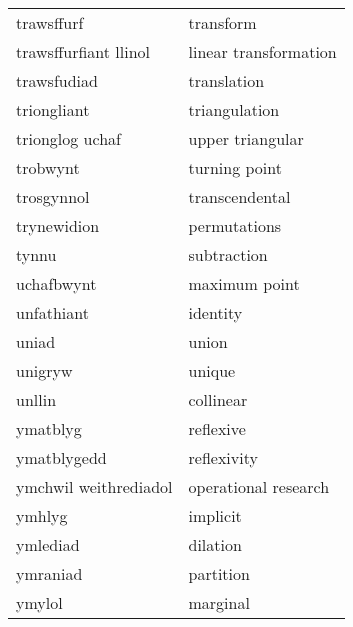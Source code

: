 \begin{supertabular}{p{0.22\textwidth}p{0.22\textwidth}}
                      trawsffurf &                         transform \\
           trawsffurfiant llinol &             linear transformation \\
                     trawsfudiad &                       translation \\
                     triongliant &                     triangulation \\
                 trionglog uchaf &                  upper triangular \\
                        trobwynt &                     turning point \\
                      trosgynnol &                    transcendental \\
                     trynewidion &                      permutations \\
                           tynnu &                       subtraction \\
                      uchafbwynt &                     maximum point \\
                      unfathiant &                          identity \\
                           uniad &                             union \\
                         unigryw &                            unique \\
                          unllin &                         collinear \\
                        ymatblyg &                         reflexive \\
                     ymatblygedd &                       reflexivity \\
           ymchwil weithrediadol &              operational research \\
                          ymhlyg &                          implicit \\
                        ymlediad &                          dilation \\
                        ymraniad &                         partition \\
                          ymylol &                          marginal \\
\end{supertabular}
